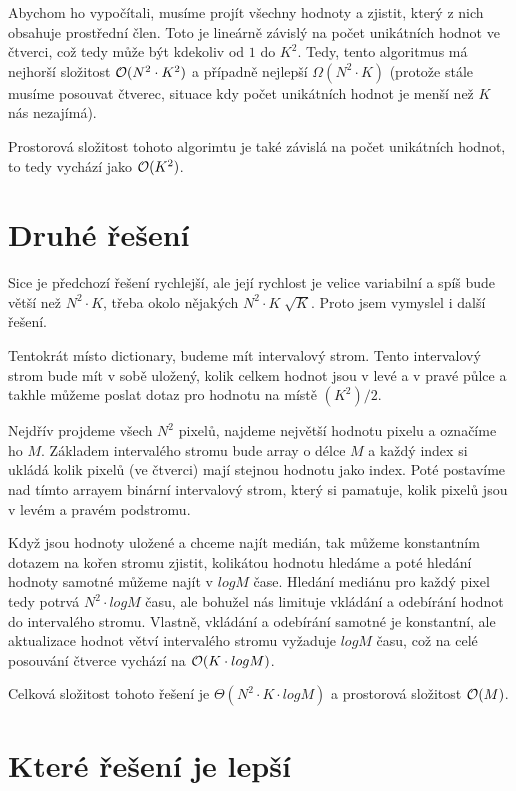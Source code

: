 \documentclass{../../../ksp}
\begin{document}
Abychom ho vypočítali, musíme projít všechny hodnoty a zjistit, který z nich obsahuje prostřední člen.
Toto je lineárně závislý na počet unikátních hodnot ve čtverci, což tedy může být kdekoliv od $1$ do $K^2$.
Tedy, tento algoritmus má nejhorší složitost $\mathcal{O}(N^2 \cdot K^2)$ a případně nejlepší $\Omega(N^2 \cdot K)$
(protože stále musíme posouvat čtverec, situace kdy počet unikátních hodnot je menší než $K$ nás nezajímá).

Prostorová složitost tohoto algorimtu je také závislá na počet unikátních hodnot, to tedy vychází jako $\mathcal{O}(K^2)$.

\section*{Druhé řešení}

Sice je předchozí řešení rychlejší, ale její rychlost je velice variabilní a spíš bude větší než $N^2 \cdot K$,
třeba okolo nějakých $N^2 \cdot K\sqrt[]{K}$. Proto jsem vymyslel i další řešení.

Tentokrát místo dictionary, budeme mít intervalový strom. Tento intervalový strom bude mít v sobě uložený,
kolik celkem hodnot jsou v levé a v pravé půlce a takhle můžeme poslat dotaz pro hodnotu na místě $(K^2)/2$.

Nejdřív projdeme všech $N^2$ pixelů, najdeme největší hodnotu pixelu a označíme ho $M$.
Základem intervalého stromu bude array o délce $M$ a každý index si ukládá kolik pixelů (ve čtverci) mají stejnou
hodnotu jako index. Poté postavíme nad tímto arrayem binární intervalový strom, který si pamatuje,
kolik pixelů jsou v levém a pravém podstromu.

Když jsou hodnoty uložené a chceme najít medián, tak můžeme konstantním dotazem na kořen stromu zjistit,
kolikátou hodnotu hledáme a poté hledání hodnoty samotné můžeme najít v $logM$ čase.
Hledání mediánu pro každý pixel tedy potrvá $N^2 \cdot logM$ času, ale bohužel nás limituje vkládání
a odebírání hodnot do intervalého stromu. Vlastně, vkládání a odebírání samotné je konstantní,
ale aktualizace hodnot větví intervalého stromu vyžaduje $logM$ času, což na celé posouvání čtverce
vychází na $\mathcal{O}(K \cdot logM)$.

Celková složitost tohoto řešení je $\Theta(N^2 \cdot K \cdot logM)$ a prostorová složitost $\mathcal{O}(M)$.

\section*{Které řešení je lepší}
\end{document}

